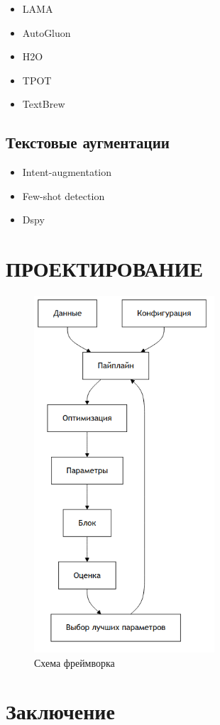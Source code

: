 \documentclass[14pt,a4paper,oneside,openany]{book}
\begin{document}
\begin{itemize}
\item LAMA\autocite{vakhrushev_lightautoml_2022}
\item AutoGluon\autocite{erickson_autogluontabular_2020}
\item H2O\autocite{ledell_h2o_2020}
\item TPOT
\item TextBrew\autocite{desai_textbrew_2022}
\end{itemize}
\section{Текстовые аугментации}
\label{sec:org4640e02}
\begin{itemize}
\item Intent-augmentation \autocite{hu_exploring_2024}
\item Few-shot detection \autocite{hou_fewshot_2021}
\item Dspy \autocite{khattab_dspy_2023}
\end{itemize}
\chapter{ПРОЕКТИРОВАНИЕ}
\label{sec:org91635ce}

\begin{figure}[h]
\centering
\includegraphics[width=0.6\textwidth,height=0.5\textheight]{img/mermaid/framework_schema.png}
\caption{\label{fig:framework_schema}Схема фреймворка}
\end{figure}
\chapter*{Заключение}
\label{sec:org1459497}
\printbibliography[title=СПИСОК\spaceИСПОЛЬЗОВАНЫХ\spaceИСТОЧНИКОВ]
\end{document}
